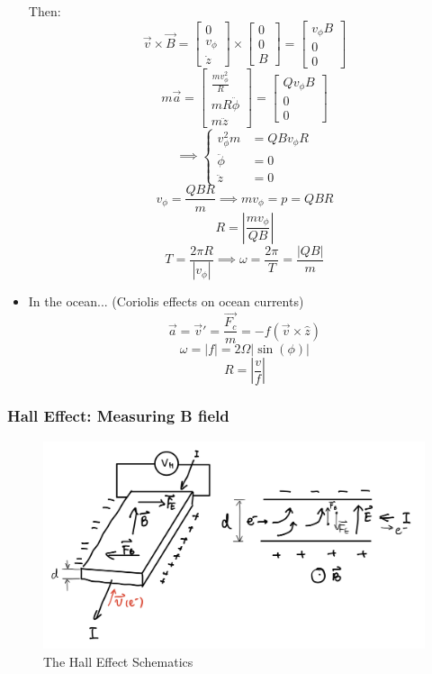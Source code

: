 \documentclass[12pt,a4paper,twoside]{article}
\numberwithin{equation}{section}
\begin{document}
\begin{itemize}
        Then:
        \[\overrightarrow{v}\times\overrightarrow{B}=\begin{bmatrix}0\\v_\phi  \\ \dot{z}\end{bmatrix}\times \begin{bmatrix}0\\0  \\B \end{bmatrix}=\begin{bmatrix}v_\phi B\\0  \\0 \end{bmatrix}\]
        \[\renewcommand\arraystretch{1.5}
        m\overrightarrow{a}=\begin{bmatrix}\frac{mv_\phi^2}{R}\\mR\ddot{\phi}  \\ m\ddot{z}\end{bmatrix}
        =\begin{bmatrix}Qv_\phi B\\0 \\0 \end{bmatrix}\]
        \[\implies
        \begin{cases}
            v_\phi^2m &= QBv_\phi R\\
            \ddot{\phi} &= 0\\
            \ddot{z} &= 0
        \end{cases}
        \]
        \[v_\phi = \frac{QBR}{m}\implies mv_\phi = p =QBR\]
        \[R = \left | \frac{mv_\phi}{QB} \right |\]
        \[T=\frac{2\pi R}{|v_\phi|}\implies \omega=\frac{2\pi}{T}=\frac{|QB|}{m}\]
        
    \item In the ocean... (Coriolis effects on ocean currents)
    \[\overrightarrow{a}=\overrightarrow{v}'=\frac{\overrightarrow{F_c}}{m}=-f(\overrightarrow{v}\times \hat{z})\]
    \[\omega = |f|=2\Omega|\sin(\phi)|\]
    \[R=\left|\frac{v}{f}\right|\]
    \end{itemize}
    \newpage
    
\subsubsection{Hall Effect: Measuring B field}
    \begin{figure}[ht]
        \centering
        \includegraphics[width=12cm]{250-Revision/hall.png}
        \caption{The Hall Effect Schematics}
        \label{fig:hall-effect}
    \end{figure}
    
\end{document}

